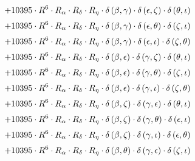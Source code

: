 \begin{subequations}
\begin{gather}
 \\[0.2em] \notag 		 + 10395 \cdot R^{6} \cdot R_{\alpha{}} \cdot R_{\delta{}} \cdot R_{\eta{}} \cdot \delta{}\left(\beta{}, \gamma{}\right) \cdot \delta{}\left(\epsilon{}, \zeta{}\right) \cdot \delta{}\left(\theta{}, \iota{}\right) 
 \\[0.2em] \notag 		 + 10395 \cdot R^{6} \cdot R_{\alpha{}} \cdot R_{\delta{}} \cdot R_{\eta{}} \cdot \delta{}\left(\beta{}, \gamma{}\right) \cdot \delta{}\left(\epsilon{}, \theta{}\right) \cdot \delta{}\left(\zeta{}, \iota{}\right) 
 \\[0.2em] \notag 		 + 10395 \cdot R^{6} \cdot R_{\alpha{}} \cdot R_{\delta{}} \cdot R_{\eta{}} \cdot \delta{}\left(\beta{}, \gamma{}\right) \cdot \delta{}\left(\epsilon{}, \iota{}\right) \cdot \delta{}\left(\zeta{}, \theta{}\right) 
 \\[0.2em] \notag 		 + 10395 \cdot R^{6} \cdot R_{\alpha{}} \cdot R_{\delta{}} \cdot R_{\eta{}} \cdot \delta{}\left(\beta{}, \epsilon{}\right) \cdot \delta{}\left(\gamma{}, \zeta{}\right) \cdot \delta{}\left(\theta{}, \iota{}\right) 
 \\[0.2em] \notag 		 + 10395 \cdot R^{6} \cdot R_{\alpha{}} \cdot R_{\delta{}} \cdot R_{\eta{}} \cdot \delta{}\left(\beta{}, \epsilon{}\right) \cdot \delta{}\left(\gamma{}, \theta{}\right) \cdot \delta{}\left(\zeta{}, \iota{}\right) 
 \\[0.2em] \notag 		 + 10395 \cdot R^{6} \cdot R_{\alpha{}} \cdot R_{\delta{}} \cdot R_{\eta{}} \cdot \delta{}\left(\beta{}, \epsilon{}\right) \cdot \delta{}\left(\gamma{}, \iota{}\right) \cdot \delta{}\left(\zeta{}, \theta{}\right) 
 \\[0.2em] \notag 		 + 10395 \cdot R^{6} \cdot R_{\alpha{}} \cdot R_{\delta{}} \cdot R_{\eta{}} \cdot \delta{}\left(\beta{}, \zeta{}\right) \cdot \delta{}\left(\gamma{}, \epsilon{}\right) \cdot \delta{}\left(\theta{}, \iota{}\right) 
 \\[0.2em] \notag 		 + 10395 \cdot R^{6} \cdot R_{\alpha{}} \cdot R_{\delta{}} \cdot R_{\eta{}} \cdot \delta{}\left(\beta{}, \zeta{}\right) \cdot \delta{}\left(\gamma{}, \theta{}\right) \cdot \delta{}\left(\epsilon{}, \iota{}\right) 
 \\[0.2em] \notag 		 + 10395 \cdot R^{6} \cdot R_{\alpha{}} \cdot R_{\delta{}} \cdot R_{\eta{}} \cdot \delta{}\left(\beta{}, \zeta{}\right) \cdot \delta{}\left(\gamma{}, \iota{}\right) \cdot \delta{}\left(\epsilon{}, \theta{}\right) 
 \\[0.2em] \notag 		 + 10395 \cdot R^{6} \cdot R_{\alpha{}} \cdot R_{\delta{}} \cdot R_{\eta{}} \cdot \delta{}\left(\beta{}, \theta{}\right) \cdot \delta{}\left(\gamma{}, \epsilon{}\right) \cdot \delta{}\left(\zeta{}, \iota{}\right) 

\end{gather}
\end{subequations}
